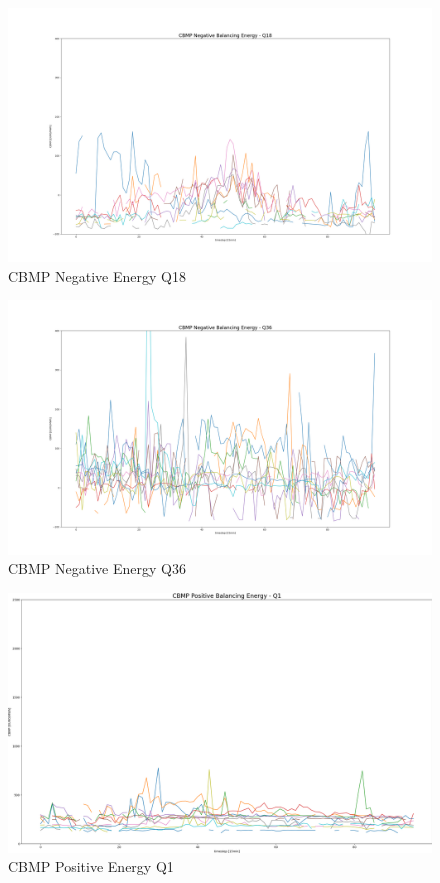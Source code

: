 \begin{figure}[H]
	\centering
	\includegraphics[width=1\linewidth]{pictures/results/CBMP_negBal_Q18.png}
	\caption{CBMP Negative Energy Q18}
	\label{fig:CBMP_negBal_Q18}
\end{figure}


\begin{figure}[H]
	\centering
	\includegraphics[width=1\linewidth]{pictures/results/CBMP_negBal_Q36.png}
	\caption{CBMP Negative Energy Q36}
	\label{fig:CBMP_negBal_Q36}
\end{figure}

\begin{figure}
	\includegraphics[width=1\linewidth]{pictures/results/CBMP_PosBal_Q1.png}
	\caption{CBMP Positive Energy Q1}
	\label{fig:CBMP_PosBal_Q1}
\end{figure}

